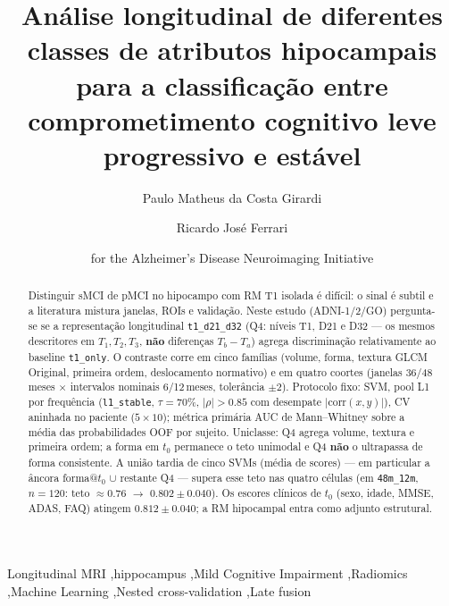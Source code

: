 \documentclass[review]{elsarticle}
\newcommand{\code}[1]{\texttt{#1}}
\begin{document}
	\begin{frontmatter}
		
		\title{Análise longitudinal de diferentes classes de atributos hipocampais para a classificação entre comprometimento cognitivo leve progressivo e estável}
		
		\author[ufscar]{Paulo Matheus da Costa Girardi}
		
		\author[ufscar]{Ricardo José Ferrari}
		
		
		\address[ufscar]{Department of Computing, Federal University of São Carlos, Rod.\ Washington Luis, Km 235, 13565-905, São Carlos, SP, Brazil}
		
		\author[]{for the Alzheimer's Disease Neuroimaging Initiative}
		
		\begin{abstract}
			Distinguir sMCI de pMCI no hipocampo com RM T1 isolada é difícil: o sinal é subtil e a literatura mistura janelas, ROIs e validação.
			Neste estudo (ADNI-1/2/GO) pergunta-se se a representação longitudinal \code{t1\_d21\_d32} (Q4: níveis T1, D21 e D32 --- os mesmos descritores em $T_1,T_2,T_3$, \textbf{não} diferenças $T_b-T_a$) agrega discriminação relativamente ao baseline \code{t1\_only}.
			O contraste corre em cinco famílias (volume, forma, textura GLCM Original, primeira ordem, deslocamento normativo) e em quatro coortes (janelas 36/48\,meses $\times$ intervalos nominais 6/12\,meses, tolerância $\pm 2$).
			Protocolo fixo: SVM, pool L1 por frequência (\code{l1\_stable}, $\tau=70\%$, $|\rho|>0.85$ com desempate $|\mathrm{corr}(x,y)|$), CV aninhada no paciente ($5\times 10$); métrica primária AUC de Mann--Whitney sobre a média das probabilidades OOF por sujeito.
			Uniclasse: Q4 agrega volume, textura e primeira ordem; a forma em $t_0$ permanece o teto unimodal e Q4 \textbf{não} o ultrapassa de forma consistente.
			A união tardia de cinco SVMs (média de scores) --- em particular a âncora forma@$t_0$ $\cup$ restante Q4 --- supera esse teto nas quatro células (em \code{48m\_12m}, $n=120$: teto $\approx 0.76$ $\to$ $0.802\pm0.040$).
			Os escores clínicos de $t_0$ (sexo, idade, MMSE, ADAS, FAQ) atingem $0.812\pm0.040$; a RM hipocampal entra como adjunto estrutural.
		\end{abstract}
		
		\begin{keyword}
			Longitudinal MRI \sep hippocampus \sep Mild Cognitive Impairment \sep Radiomics \sep Machine Learning \sep Nested cross-validation \sep Late fusion
		\end{keyword}
		
	\end{frontmatter}
	
\end{document}

